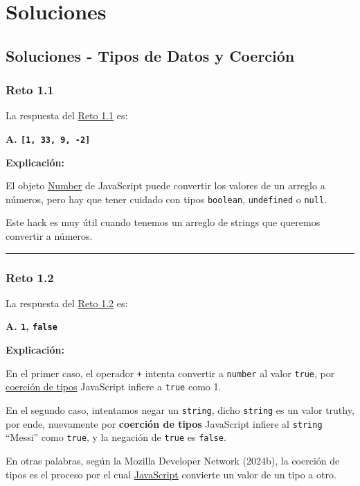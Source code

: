 \documentclass[
  letterpaper,
  DIV=11,
  numbers=noendperiod]{scrreprt}
\begin{document}
\part{Soluciones}

\chapter{Soluciones - Tipos de Datos y
Coerción}\label{soluciones---tipos-de-datos-y-coerciuxf3n}

\section{Reto 1.1}\label{sec-sol-cap1-reto1}

La respuesta del \hyperref[sec-cap1-reto1]{Reto 1.1} es:

\textbf{A. \texttt{{[}1,\ 33,\ 9,\ -2{]}}}

\textbf{Explicación:}

El objeto \hyperref[glos-number]{Number} de JavaScript puede convertir
los valores de un arreglo a números, pero hay que tener cuidado con
tipos \texttt{boolean}, \texttt{undefined} o \texttt{null}.

Este hack es muy útil cuando tenemos un arreglo de strings que queremos
convertir a números.

\begin{center}\rule{0.5\linewidth}{0.5pt}\end{center}

\section{Reto 1.2}\label{sec-sol-cap1-reto2}

La respuesta del \hyperref[sec-cap1-reto2]{Reto 1.2} es:

\textbf{A. \texttt{1}, \texttt{false}}

\textbf{Explicación:}

En el primer caso, el operador \texttt{+} intenta convertir a
\texttt{number} al valor \texttt{true}, por
\hyperref[glos-coercion]{coerción de tipos} JavaScript infiere a
\texttt{true} como 1.

En el segundo caso, intentamos negar un \texttt{string}, dicho
\texttt{string} es un valor truthy, por ende, nuevamente por
\textbf{coerción de tipos} JavaScript infiere al \texttt{string}
``Messi'' como \texttt{true}, y la negación de \texttt{true} es
\texttt{false}.

En otras palabras, según la Mozilla Developer Network (2024b), la
coerción de tipos es el proceso por el cual
\hyperref[glos-javascript]{JavaScript} convierte un valor de un tipo a
otro.
\end{document}
